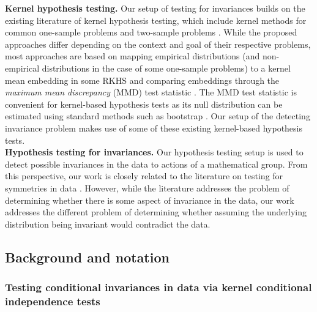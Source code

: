 \textbf{Kernel hypothesis testing.} Our setup of testing for invariances builds on the existing literature of kernel hypothesis testing, which include kernel methods for common one-sample problems \parencite{Zhang:2011,Doran:2014,Kellner:2015,Chwialkowski:2016,Jitkrittum:2020} and two-sample problems \parencite{Gretton:2007,Gretton:2012}. While the proposed approaches differ depending on the context and goal of their respective problems, most approaches are based on mapping empirical  distributions (and non-empirical distributions in the case of some one-sample problems) to a kernel mean embedding in some RKHS and comparing embeddings through the \textit{maximum mean discrepancy} (MMD) test statistic \parencite{Harchaoui:2013}. The MMD test statistic is convenient for kernel-based hypothesis tests as its null distribution can be estimated using standard methods such as bootstrap \parencite{Gretton:2012}. Our setup of the detecting invariance problem makes use of some of these existing kernel-based hypothesis tests.
\\

\textbf{Hypothesis testing for invariances.}
Our hypothesis testing setup is used to detect possible invariances in the data to actions of a mathematical group. From this perspective, our work is closely related to the literature on testing for symmetries in data \parencite{Henze:2003,NgatchouWandji:2009,Partlett:2015}. However, while the literature addresses the problem of determining whether there is some aspect of invariance in the data, our work addresses the different problem of determining whether assuming the underlying distribution being invariant would contradict the data.

\subsection{Background and notation}

\subsubsection{Testing conditional invariances in data via kernel conditional independence tests}

